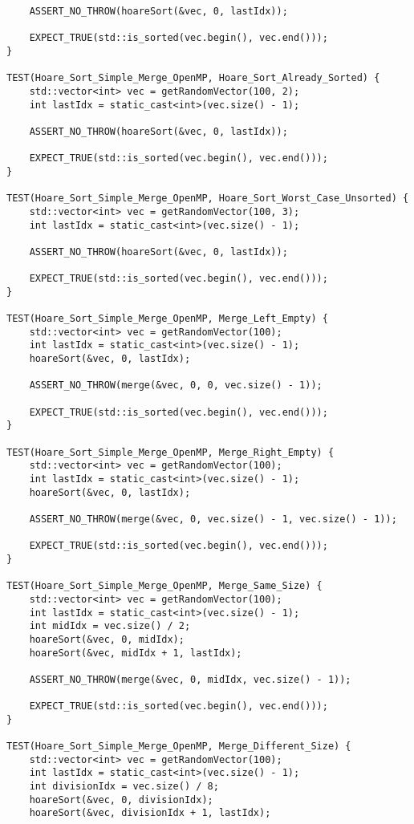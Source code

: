 \documentclass{report}
\begin{document}
\begin{lstlisting}
    ASSERT_NO_THROW(hoareSort(&vec, 0, lastIdx));

    EXPECT_TRUE(std::is_sorted(vec.begin(), vec.end()));
}

TEST(Hoare_Sort_Simple_Merge_OpenMP, Hoare_Sort_Already_Sorted) {
    std::vector<int> vec = getRandomVector(100, 2);
    int lastIdx = static_cast<int>(vec.size() - 1);

    ASSERT_NO_THROW(hoareSort(&vec, 0, lastIdx));

    EXPECT_TRUE(std::is_sorted(vec.begin(), vec.end()));
}

TEST(Hoare_Sort_Simple_Merge_OpenMP, Hoare_Sort_Worst_Case_Unsorted) {
    std::vector<int> vec = getRandomVector(100, 3);
    int lastIdx = static_cast<int>(vec.size() - 1);

    ASSERT_NO_THROW(hoareSort(&vec, 0, lastIdx));

    EXPECT_TRUE(std::is_sorted(vec.begin(), vec.end()));
}

TEST(Hoare_Sort_Simple_Merge_OpenMP, Merge_Left_Empty) {
    std::vector<int> vec = getRandomVector(100);
    int lastIdx = static_cast<int>(vec.size() - 1);
    hoareSort(&vec, 0, lastIdx);

    ASSERT_NO_THROW(merge(&vec, 0, 0, vec.size() - 1));

    EXPECT_TRUE(std::is_sorted(vec.begin(), vec.end()));
}

TEST(Hoare_Sort_Simple_Merge_OpenMP, Merge_Right_Empty) {
    std::vector<int> vec = getRandomVector(100);
    int lastIdx = static_cast<int>(vec.size() - 1);
    hoareSort(&vec, 0, lastIdx);

    ASSERT_NO_THROW(merge(&vec, 0, vec.size() - 1, vec.size() - 1));

    EXPECT_TRUE(std::is_sorted(vec.begin(), vec.end()));
}

TEST(Hoare_Sort_Simple_Merge_OpenMP, Merge_Same_Size) {
    std::vector<int> vec = getRandomVector(100);
    int lastIdx = static_cast<int>(vec.size() - 1);
    int midIdx = vec.size() / 2;
    hoareSort(&vec, 0, midIdx);
    hoareSort(&vec, midIdx + 1, lastIdx);

    ASSERT_NO_THROW(merge(&vec, 0, midIdx, vec.size() - 1));

    EXPECT_TRUE(std::is_sorted(vec.begin(), vec.end()));
}

TEST(Hoare_Sort_Simple_Merge_OpenMP, Merge_Different_Size) {
    std::vector<int> vec = getRandomVector(100);
    int lastIdx = static_cast<int>(vec.size() - 1);
    int divisionIdx = vec.size() / 8;
    hoareSort(&vec, 0, divisionIdx);
    hoareSort(&vec, divisionIdx + 1, lastIdx);


\end{lstlisting}
\end{document}
